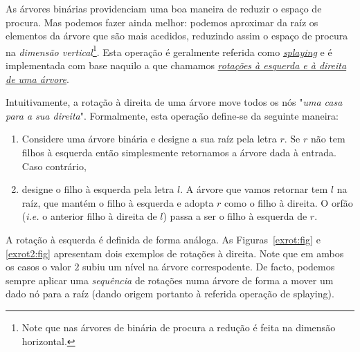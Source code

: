 \documentclass[a4paper]{article}
\begin{document}
\smallskip
  \noindent
    As árvores binárias providenciam uma boa maneira de reduzir o espaço
    de procura. Mas podemos fazer ainda melhor: podemos aproximar da
    raíz os elementos da árvore que são mais acedidos, reduzindo assim
    o espaço de procura na \emph{dimensão vertical}\footnote{Note que
    nas árvores de binária de procura a redução é feita na dimensão
    horizontal.}. Esta operação é geralmente
    referida como
    \href{https://en.wikipedia.org/wiki/Splay_tree}{\emph{splaying}} e
    é implementada com base naquilo a que chamamos
    \href{https://en.wikipedia.org/wiki/Tree_rotation}{\emph{rotações à esquerda
    e à direita de uma  árvore}}.

    Intuitivamente, a rotação à direita de uma árvore move todos os
    nós "\emph{uma casa para a sua direita}". Formalmente,
    esta operação define-se da seguinte maneira:
    \begin{enumerate}
       \item Considere uma árvore binária e designe a sua
       raíz pela letra $r$. Se $r$ não tem filhos à esquerda então simplesmente
       retornamos a árvore dada à entrada. Caso contrário,
       \item designe o filho à esquerda pela letra $l$. A árvore
       que vamos retornar tem $l$ na raíz, que mantém o filho à esquerda
       e adopta $r$ como o filho à direita. O orfão (\emph{i.e.} o anterior
       filho à direita de $l$) passa a ser o filho à esquerda de $r$.
    \end{enumerate}
    A rotação à esquerda é definida de forma análoga. As
       Figuras~\ref{exrot:fig} e \ref{exrot2:fig} apresentam dois
       exemplos de rotações à direita. Note que em ambos os casos o
       valor $2$ subiu um nível na árvore correspodente. De facto,
       podemos sempre aplicar uma \emph{sequência} de rotações numa
       árvore de forma a mover um dado nó para a raíz (dando origem
       portanto à referida operação de splaying).
\end{document}
